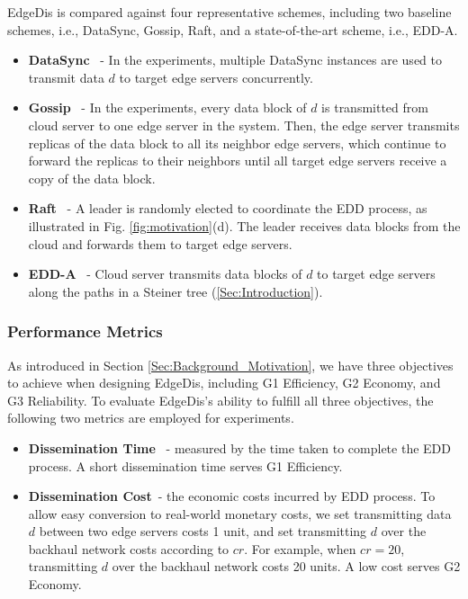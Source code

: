\documentclass[10pt,journal,compsoc]{IEEEtran}
\begin{document}
EdgeDis is compared against four representative schemes, including two baseline schemes, i.e., DataSync, Gossip, Raft, and a state-of-the-art scheme, i.e., EDD-A.

\begin{itemize}
    \item \textbf{DataSync}~\cite{datasync2018AWS} - In the experiments, multiple DataSync instances are used to transmit data $d$ to target edge servers concurrently. 
    \item \textbf{Gossip}~\cite{boyd2006randomized} - In the experiments, every data block of $d$ is transmitted from cloud server to one edge server in the system. Then, the edge server transmits replicas of the data block to all its neighbor edge servers, which continue to forward the replicas to their neighbors until all target edge servers receive a copy of the data block. 
    
     \item \textbf{Raft}~\cite{ongaro2014Raft} - A leader is randomly elected to coordinate the EDD process, as illustrated in Fig. \ref{fig:motivation}(d). The leader receives data blocks from the cloud and forwards them to target edge servers.   
     
    \item \textbf{EDD-A}~\cite{xia2021cost} - Cloud server transmits data blocks of $d$ to target edge servers along the paths in a Steiner tree (\cref{Sec:Introduction}).


    
\end{itemize}

%
\subsubsection{Performance Metrics}
\label{subsubSec:PerformanceMetrics}
As introduced in Section \ref{Sec:Background_Motivation}, we have three objectives to achieve when designing EdgeDis, including G1 Efficiency, G2 Economy, and G3 Reliability. To evaluate EdgeDis's ability to fulfill all three objectives, the following two metrics are employed for experiments. 

\begin{itemize}
    \item \textbf{Dissemination Time}~\cite{xia2021cost,xia2022formulating} - measured by the time taken to complete the EDD process. A short dissemination time serves G1 Efficiency.
    \item \textbf{Dissemination Cost}~\cite{xia2021cost,xia2022formulating}- the economic costs incurred by EDD process. To allow easy conversion to real-world monetary costs, we set transmitting data $d$ between two edge servers costs 1 unit, and set transmitting $d$ over the backhaul network costs according to $cr$. For example, when $cr=20$, transmitting $d$ over the backhaul network costs 20 units. A low cost serves G2 Economy.
\end{itemize}
\end{document}
